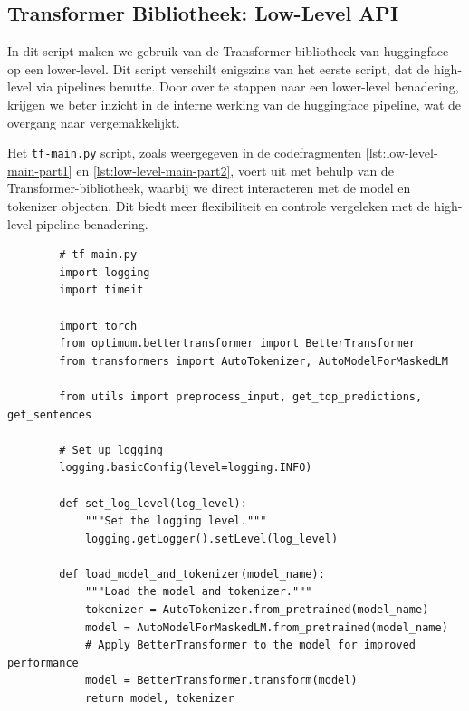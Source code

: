 \subsection{Transformer Bibliotheek: Low-Level API}

In dit script maken we gebruik van de Transformer-bibliotheek van \gls{huggingface} op een lower-level. Dit script verschilt enigszins van het eerste script, dat de high-level  via pipelines benutte. Door over te stappen naar een lower-level benadering, krijgen we beter inzicht in de interne werking van de \gls{huggingface} pipeline, wat de overgang naar  vergemakkelijkt.

Het \texttt{tf-main.py} script, zoals weergegeven in de codefragmenten \ref{lst:low-level-main-part1} en \ref{lst:low-level-main-part2}, voert  uit met behulp van de Transformer-bibliotheek, waarbij we direct interacteren met de model en tokenizer objecten. Dit biedt meer flexibiliteit en controle vergeleken met de high-level pipeline benadering.

\begin{listing} [ht]
    \begin{verbatim}
        # tf-main.py
        import logging
        import timeit
        
        import torch
        from optimum.bettertransformer import BetterTransformer
        from transformers import AutoTokenizer, AutoModelForMaskedLM
        
        from utils import preprocess_input, get_top_predictions, get_sentences
        
        # Set up logging
        logging.basicConfig(level=logging.INFO)
        
        def set_log_level(log_level):
            """Set the logging level."""
            logging.getLogger().setLevel(log_level)
        
        def load_model_and_tokenizer(model_name):
            """Load the model and tokenizer."""
            tokenizer = AutoTokenizer.from_pretrained(model_name)
            model = AutoModelForMaskedLM.from_pretrained(model_name)
            # Apply BetterTransformer to the model for improved performance
            model = BetterTransformer.transform(model)
            return model, tokenizer
    \end{verbatim}
    \caption[\texttt{tf-main.py} (deel 1)]{Het eerste deel van \texttt{tf-main.py} laadt de modellen en tokenizers op een lager niveau. Dit geeft meer controle over de modelparameters en laat verbeteringen toe door de integratie van \texttt{BetterTransformer}, wat zorgt voor verhoogde prestaties. Hoewel deze optimalisaties de modellen zouden moeten verbeteren, zullen we later in de evaluatie zien dat dit weinig verschil maakt. Dit komt waarschijnlijk omdat de \texttt{pipeline}  van \gls{huggingface} deze optimalisaties al intern gebruikt.}
    \label{lst:low-level-main-part1}
\end{listing}

